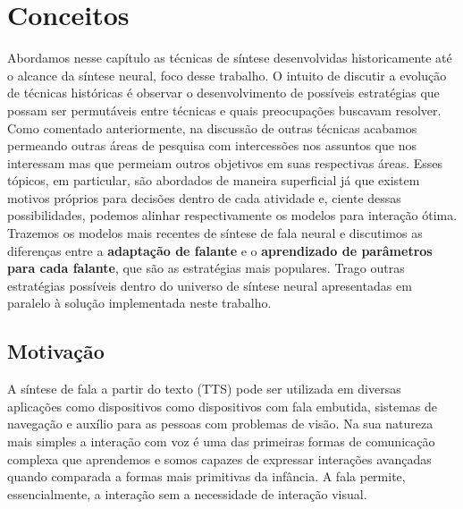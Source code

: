 \chapter{Conceitos}



\label{cap:conceitos}
Abordamos nesse capítulo as técnicas de síntese desenvolvidas historicamente até o alcance da síntese neural, foco desse trabalho. O intuito de discutir a evolução de técnicas históricas é observar o desenvolvimento de possíveis estratégias que possam ser permutáveis entre técnicas e quais preocupações buscavam resolver. Como comentado anteriormente, na discussão de outras técnicas acabamos permeando outras áreas de pesquisa com intercessões nos assuntos que nos interessam mas que permeiam outros objetivos em suas respectivas áreas. Esses tópicos, em particular, são abordados de maneira superficial já que existem motivos próprios para decisões dentro de cada atividade e, ciente dessas possibilidades, podemos alinhar respectivamente os modelos para interação ótima. Trazemos os modelos mais recentes de síntese de fala neural e discutimos as diferenças entre a \textbf{adaptação de falante} e o \textbf{aprendizado de parâmetros para cada falante}, que são as estratégias mais populares. Trago outras estratégias possíveis dentro do universo de síntese neural apresentadas em paralelo à solução implementada neste trabalho.

\section{Motivação}

A síntese de fala a partir do texto (TTS) pode ser utilizada em diversas aplicações como dispositivos como dispositivos com fala embutida, sistemas de navegação e auxílio para as pessoas com problemas de visão. Na sua natureza mais simples a interação com voz é uma das primeiras formas de comunicação complexa que aprendemos e somos capazes de expressar interações avançadas quando comparada a formas mais primitivas da infância. A fala permite, essencialmente, a interação sem a necessidade de interação visual. 

